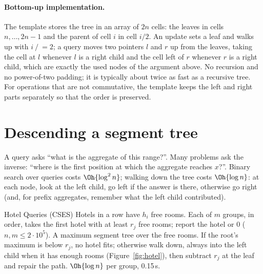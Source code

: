 \paragraph{Bottom-up implementation.} The template stores the tree in an array of $2n$ cells: the leaves in cells $n, \dots, 2n - 1$
and the parent of cell $i$ in cell $i / 2$. An update sets a leaf and walks up with $i \mathrel{/}= 2$; a query moves two pointers $l$
and $r$ up from the leaves, taking the cell at $l$ whenever $l$ is a right child and the cell left of $r$ whenever $r$ is a right
child, which are exactly the used nodes of the argument above. No recursion and no power-of-two padding; it is typically about
twice as fast as a recursive tree. For operations that are not commutative,
the template keeps the left and right parts separately so that the order is preserved.


\section[Descending a segment tree]{Descending a segment tree \hfill \plat}\label{sec:segdescent}

A query asks ``what is the aggregate of this range?''. Many problems ask the inverse: ``where is the first position at which the
aggregate reaches $x$?''. Binary search over queries costs $\Oh{\log^2 n}$; walking down the tree costs $\Oh{\log n}$: at each node,
look at the left child, go left if the answer is there, otherwise go right (and, for prefix aggregates, remember what the left child
contributed).

\begin{problem}{Hotel Queries (CSES)}
Hotels in a row have $h_i$ free rooms. Each of $m$ groups, in order, takes the first hotel with at least $r_j$ free rooms; report the
hotel or 0 ($n, m \le 2 \cdot 10^5$).
\solution A maximum segment tree over the free rooms. If the root's maximum is below $r_j$, no hotel fits; otherwise walk down,
always into the left child when it has enough rooms (Figure~\ref{fig:hotel}), then subtract $r_j$ at the leaf and repair the
path. $\Oh{\log n}$ per group, 0.15\,s.
\end{problem}

